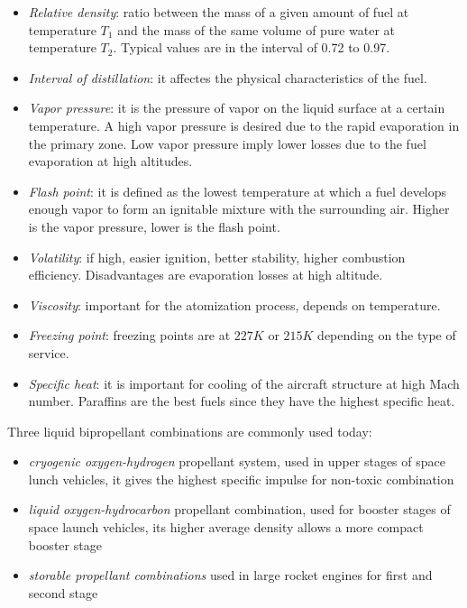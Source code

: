 \documentclass[12pt]{article}
\begin{document}
\begin{itemize}
    \item \textit{Relative density}: ratio between the mass of a given amount of fuel at temperature $T_{1}$ and the mass of the same volume of pure water at temperature $T_{2}$. Typical values are in the interval of 0.72 to 0.97.
    \item \textit{Interval of distillation}: it affectes the physical characteristics of the fuel.
    \item \textit{Vapor pressure}: it is the pressure of vapor on the liquid surface at a certain temperature. A high vapor pressure is desired due to the rapid evaporation in the primary zone. Low vapor pressure imply lower losses due to the fuel evaporation at high altitudes.
    \item \textit{Flash point}: it is defined as the lowest temperature at which a fuel develops enough vapor to form an ignitable mixture with the surrounding air. Higher is the vapor pressure, lower is the flash point.
    \item \textit{Volatility}: if high, easier ignition, better stability, higher combustion efficiency. Disadvantages are evaporation losses at high altitude.
    \item \textit{Viscosity}: important for the atomization process, depends on temperature.
    \item \textit{Freezing point}: freezing points are at $227 K$ or $215 K$ depending on the type of service.
    \item \textit{Specific heat}: it is important for cooling of the aircraft structure at high Mach number. Paraffins are the best fuels since they have the highest specific heat.
\end{itemize}

Three liquid bipropellant combinations are commonly used today:

\begin{itemize}
    \item \textit{cryogenic oxygen-hydrogen} propellant system, used in upper stages of space lunch vehicles, it gives the highest specific impulse for non-toxic combination
    \item \textit{liquid oxygen-hydrocarbon} propellant combination, used for booster stages of space launch vehicles, its higher average density allows a more compact booster stage
    \item \textit{storable propellant combinations} used in large rocket engines for first and second stage
\end{itemize}
\end{document}
